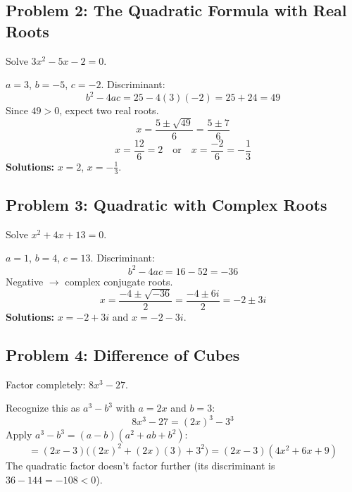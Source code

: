 \documentclass[11pt, letterpaper]{article}
\begin{document}
\subsection*{Problem 2: The Quadratic Formula with Real Roots}

Solve $3x^2 - 5x - 2 = 0$.

\begin{tcolorbox}[colback=examplebg, colframe=exampleborder,
  title={\bfseries Solution}, arc=3pt, boxrule=1pt]
$a = 3$, $b = -5$, $c = -2$. Discriminant:
\[
b^2 - 4ac = 25 - 4(3)(-2) = 25 + 24 = 49
\]
Since $49 > 0$, expect two real roots.
\[
x = \frac{5 \pm \sqrt{49}}{6} = \frac{5 \pm 7}{6}
\]
\[
x = \frac{12}{6} = 2 \quad\text{or}\quad x = \frac{-2}{6} = -\frac{1}{3}
\]
\textbf{Solutions:} $x = 2$, $x = -\tfrac{1}{3}$.
\end{tcolorbox}

\subsection*{Problem 3: Quadratic with Complex Roots}

Solve $x^2 + 4x + 13 = 0$.

\begin{tcolorbox}[colback=examplebg, colframe=exampleborder,
  title={\bfseries Solution}, arc=3pt, boxrule=1pt]
$a = 1$, $b = 4$, $c = 13$. Discriminant:
\[
b^2 - 4ac = 16 - 52 = -36
\]
Negative $\to$ complex conjugate roots.
\[
x = \frac{-4 \pm \sqrt{-36}}{2} = \frac{-4 \pm 6i}{2} = -2 \pm 3i
\]
\textbf{Solutions:} $x = -2 + 3i$ and $x = -2 - 3i$.
\end{tcolorbox}

\subsection*{Problem 4: Difference of Cubes}

Factor completely: $8x^3 - 27$.

\begin{tcolorbox}[colback=examplebg, colframe=exampleborder,
  title={\bfseries Solution}, arc=3pt, boxrule=1pt]
Recognize this as $a^3 - b^3$ with $a = 2x$ and $b = 3$:
\[
8x^3 - 27 = (2x)^3 - 3^3
\]
Apply $a^3 - b^3 = (a-b)(a^2 + ab + b^2)$:
\[
= (2x - 3)\big((2x)^2 + (2x)(3) + 3^2\big) = (2x - 3)(4x^2 + 6x + 9)
\]
The quadratic factor doesn't factor further (its discriminant is $36 - 144 = -108 < 0$).
\end{tcolorbox}

\newpage
\end{document}
